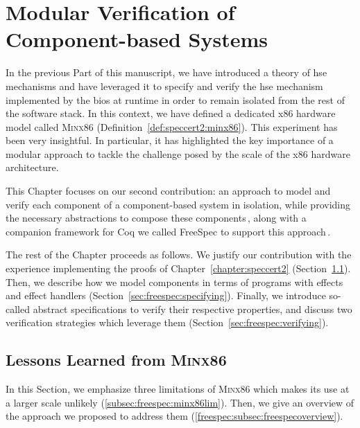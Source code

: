 \chapter{Modular Verification of Component-based Systems}
\label{chapter:freespec}


\vspace{1cm}%
\noindent
%
In the previous Part of this manuscript, we have introduced a theory of \ac{hse}
mechanisms and have leveraged it to specify and verify the \ac{hse} mechanism
implemented by the \ac{bios} at runtime in order to remain isolated from the
rest of the software stack.
%
In this context, we have defined a dedicated x86 hardware model called {\scshape
  Minx86} (Definition~\ref{def:speccert2:minx86}).
%
This experiment has been very insightful.
%
In particular, it has highlighted the key importance of a modular approach to
tackle the challenge posed by the scale of the x86 hardware architecture.
%

This Chapter focuses on our second contribution: an approach to model and verify
each component of a component-based system in isolation, while providing the
necessary abstractions to compose these components\,\cite{letan2018freespec},
along with a companion framework for Coq we called FreeSpec to support this
approach\,\cite{letan2018freespeccode}.

The rest of the Chapter proceeds as follows.
%
We justify our contribution with the experience implementing the proofs of
Chapter~\ref{chapter:speccert2} (Section~\ref{sec:freespec:why}).
%
Then, we describe how we model components in terms of programs with effects and
effect handlers (Section~\ref{sec:freespec:specifying}).
%
Finally, we introduce so-called abstract specifications to verify their
respective properties, and discuss two verification strategies which leverage
them (Section~\ref{sec:freespec:verifying}).

\section{Lessons Learned from {\scshape Minx86}}
\label{sec:freespec:why}

In this Section, we emphasize three limitations of {\scshape Minx86} which makes
its use at a larger scale unlikely (\ref{subsec:freespec:minx86lim}).
%
Then, we give an overview of the approach we proposed to address them
(\ref{freespec:subsec:freespecoverview}).

